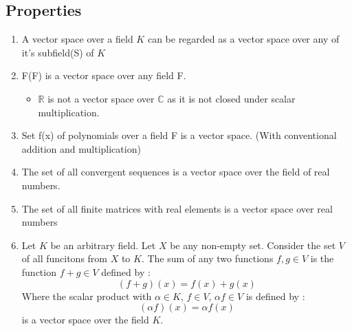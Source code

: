 \documentclass[twoside]{article}
\begin{document}
	\subsection{Properties}
	\begin{enumerate}
		\item A vector space over a field $K$ can be regarded as a vector space over any of it's subfield(S) of $K$
		\item F(F) is a vector space over any field F.
			\begin{itemize}
				\item $\mathbb{R}$ is not a vector space over $\mathbb{C}$ as it is not closed under scalar multiplication.
			\end{itemize}
		\item Set f(x) of polynomials over a field F is a vector space. (With conventional addition and multiplication)
		\item The set of all convergent sequences is a vector space over the field of real numbers.
		\item The set of all finite matrices with real elements is a vector space over real numbers
		\item Let $K$ be an arbitrary field. Let $X$ be any non-empty set. Consider the set $V$ of all funcitons from $X$ to $K$. The sum of any two functions $f,g \in V$ is the function $f + g \in V$ defined by : 
		\[(f+g)(x) = f(x) + g(x)\]
		Where the scalar product with $\alpha \in K$, $f \in V$, $\alpha f \in V$ is defined by :
		\[(\alpha f)(x) = \alpha f(x)\]
		is a vector space over the field $K$.
	\end{enumerate}
\end{document}

